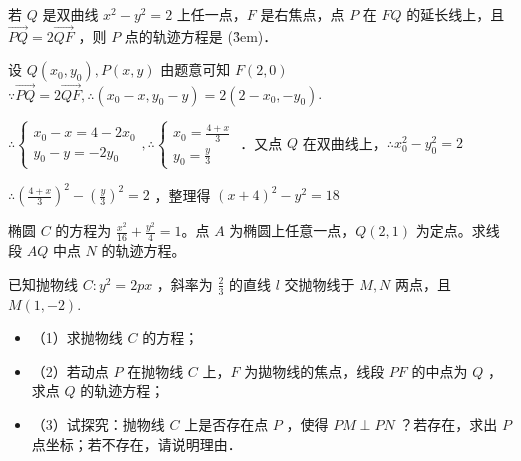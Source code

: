 \vspace{2em}

\begin{example}
    若 $Q$ 是双曲线 $x^2-y^2=2$ 上任一点，$F$ 是右焦点，点 $P$ 在 $F Q$ 的延长线上，且 $\overrightarrow{P Q}=2 \overrightarrow{Q F}$ ，则 $P$ 点的轨迹方程是 (\h{3em})．
\end{example}

\begin{solution}
    设 $Q\left(x_0, y_0\right), P(x, y)$ 由题意可知 $F(2,0)$
    $\because \overrightarrow{P Q}=2 \overrightarrow{Q F}, \therefore\left(x_0-x, y_0-y\right)=2\left(2-x_0,-y_0\right)$.

    \vspace{0.2cm}

    $\therefore\left\{\begin{array}{l}x_0-x=4-2 x_0 \\ y_0-y=-2 y_0\end{array}, \therefore\left\{\begin{array}{l}x_0=\frac{4+x}{3} \\ y_0=\frac{y}{3}\end{array}\right.\right.$ ．又点 $Q$ 在双曲线上，$\therefore x_0^2-y_0^2=2$

    \begin{center}
        $\therefore\left(\frac{4+x}{3}\right)^2-\left(\frac{y}{3}\right)^2=2$ ，整理得 $(x+4)^2-y^2=18$
    \end{center}
\end{solution}

\vspace{2em}

\begin{example}
    椭圆 $C$ 的方程为 $\frac{x^2}{16} + \frac{y^2}{4} = 1$。点 $A$ 为椭圆上任意一点，$Q(2, 1)$ 为定点。求线段 $AQ$ 中点 $N$ 的轨迹方程。
\end{example}

\vspace{5em}

\begin{example}
    已知抛物线 $C: y^2=2 p x$ ，斜率为 $\frac{2}{3}$ 的直线 $l$ 交抛物线于 $M, N$ 两点，且 $M(1,-2)$.
    \begin{itemize}
        \item （1）求抛物线 $C$ 的方程；
        \item （2）若动点 $P$ 在抛物线 $C$ 上，$F$ 为拋物线的焦点，线段 $P F$ 的中点为 $Q$ ，求点 $Q$ 的轨迹方程；
        \item （3）试探究：抛物线 $C$ 上是否存在点 $P$ ，使得 $P M \perp P N$ ？若存在，求出 $P$ 点坐标；若不存在，请说明理由．
    \end{itemize}
\end{example}

